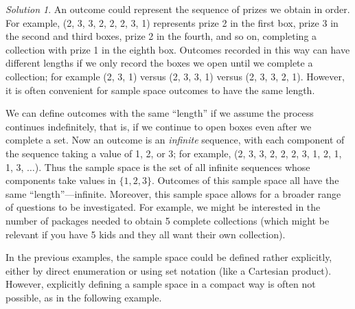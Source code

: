 \documentclass[
  letterpaper,
  DIV=11,
  numbers=noendperiod]{scrreprt}
\theoremstyle{plain}
\theoremstyle{definition}
\theoremstyle{definition}
\theoremstyle{definition}
\theoremstyle{remark}
\newtheorem{refsolution}{Solution}[chapter]
\begin{document}
\begin{tcolorbox}[enhanced jigsaw, opacityback=0, rightrule=.15mm, coltitle=black, colframe=quarto-callout-tip-color-frame, toprule=.15mm, colbacktitle=quarto-callout-tip-color!10!white, opacitybacktitle=0.6, left=2mm, toptitle=1mm, breakable, title={Solution (click to expand)}, bottomtitle=1mm, colback=white, leftrule=.75mm, titlerule=0mm, arc=.35mm, bottomrule=.15mm]

\begin{refsolution}
An outcome could represent the sequence of prizes we obtain in order.
For example, (2, 3, 3, 2, 2, 2, 3, 1) represents prize 2 in the first
box, prize 3 in the second and third boxes, prize 2 in the fourth, and
so on, completing a collection with prize 1 in the eighth box. Outcomes
recorded in this way can have different lengths if we only record the
boxes we open until we complete a collection; for example (2, 3, 1)
versus (2, 3, 3, 1) versus (2, 3, 3, 2, 1). However, it is often
convenient for sample space outcomes to have the same length.

We can define outcomes with the same ``length'' if we assume the process
continues indefinitely, that is, if we continue to open boxes even after
we complete a set. Now an outcome is an \emph{infinite} sequence, with
each component of the sequence taking a value of 1, 2, or 3; for
example, (2, 3, 3, 2, 2, 2, 3, 1, 2, 1, 1, 3, \(\ldots\)). Thus the
sample space\footnotemark{} is the set of all infinite sequences whose
components take values in \(\{1, 2, 3\}\). Outcomes of this sample space
all have the same ``length''---infinite. Moreover, this sample space
allows for a broader range of questions to be investigated. For example,
we might be interested in the number of packages needed to obtain 5
complete collections (which might be relevant if you have 5 kids and
they all want their own collection).

\label{sol-collector-outcome}

\end{refsolution}

\end{tcolorbox}


In the previous examples, the sample space could be defined rather
explicitly, either by direct enumeration or using set notation (like a
Cartesian product). However, explicitly defining a sample space in a
compact way is often not possible, as in the following example.
\end{document}
